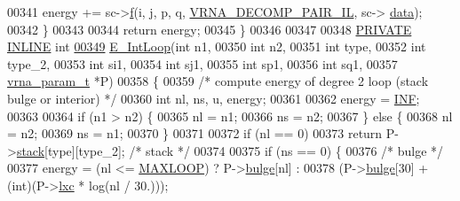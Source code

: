 \begin{DoxyCode}
00341       energy += sc->\mbox{\hyperlink{group__soft__constraints_a32dc86090237888c75491bbd4861a04b}{f}}(i, j, p, q, \mbox{\hyperlink{group__constraints_gaeab04f34d7730cff2d651d782f95d857}{VRNA\_DECOMP\_PAIR\_IL}}, sc->
      \mbox{\hyperlink{group__soft__constraints_a7574680143df97b9029146c2150bf06d}{data}});
00342   \}
00343 
00344   \textcolor{keywordflow}{return} energy;
00345 \}
00346 
00347 
00348 \mbox{\hyperlink{edit__cost_8h_a5e151c615eda34903514212f05a5ccf8}{PRIVATE}} \mbox{\hyperlink{interior__loops_8h_a2eb6f9e0395b47b8d5e3eeae4fe0c116}{INLINE}} \textcolor{keywordtype}{int}
\mbox{\hyperlink{group__loops_gaafbc187b7f78e8e82afb77dd6f3b8fc5}{00349}} \mbox{\hyperlink{group__loops_gaafbc187b7f78e8e82afb77dd6f3b8fc5}{E\_IntLoop}}(\textcolor{keywordtype}{int}           n1,
00350           \textcolor{keywordtype}{int}           n2,
00351           \textcolor{keywordtype}{int}           type,
00352           \textcolor{keywordtype}{int}           type\_2,
00353           \textcolor{keywordtype}{int}           si1,
00354           \textcolor{keywordtype}{int}           sj1,
00355           \textcolor{keywordtype}{int}           sp1,
00356           \textcolor{keywordtype}{int}           sq1,
00357           \mbox{\hyperlink{group__energy__parameters_structvrna__param__s}{vrna\_param\_t}}  *P)
00358 \{
00359   \textcolor{comment}{/* compute energy of degree 2 loop (stack bulge or interior) */}
00360   \textcolor{keywordtype}{int} nl, ns, u, energy;
00361 
00362   energy = \mbox{\hyperlink{1_88_84__epars_8h_a12c2040f25d8e3a7b9e1c2024c618cb6}{INF}};
00363 
00364   \textcolor{keywordflow}{if} (n1 > n2) \{
00365     nl  = n1;
00366     ns  = n2;
00367   \} \textcolor{keywordflow}{else} \{
00368     nl  = n2;
00369     ns  = n1;
00370   \}
00371 
00372   \textcolor{keywordflow}{if} (nl == 0)
00373     \textcolor{keywordflow}{return} P->\mbox{\hyperlink{group__energy__parameters_af7cdedcea1bb1c171856ab06dc9f6ed2}{stack}}[type][type\_2];  \textcolor{comment}{/* stack */}
00374 
00375   \textcolor{keywordflow}{if} (ns == 0) \{
00376     \textcolor{comment}{/* bulge */}
00377     energy = (nl <= \mbox{\hyperlink{energy__const_8h_ad1bd6eabac419670ddd3c9ed82145988}{MAXLOOP}}) ? P->\mbox{\hyperlink{group__energy__parameters_aa7121473b8a705f84048c09b12c1d1c2}{bulge}}[nl] :
00378              (P->\mbox{\hyperlink{group__energy__parameters_aa7121473b8a705f84048c09b12c1d1c2}{bulge}}[30] + (\textcolor{keywordtype}{int})(P->\mbox{\hyperlink{group__energy__parameters_a24ea058414d3fb918c7fbf189a4a1e51}{lxc}} * log(nl / 30.)));

\end{DoxyCode}
